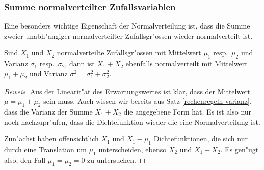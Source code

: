 \subsubsection{Summe normalverteilter Zufallsvariablen}

Eine besonders wichtige Eigenschaft der Normalverteilung ist, dass die
Summe zweier unabh"angiger normalverteilter Zufallsgr"ossen wieder normalverteilt
ist.
\begin{satz}
Sind $X_1$ und $X_2$ normalverteilte Zufallsgr"ossen mit Mittelwert $\mu_1$
resp.~$\mu_2$ und Varianz $\sigma_1$ resp.~$\sigma_2$, dann ist
$X_1+X_2$ ebenfalls normalverteilt mit Mittelwert $\mu_1+\mu_2$ und
Varianz $\sigma^2=\sigma_1^2+\sigma_2^2$.
\end{satz}
\begin{proof}[Beweis]
Aus der Linearit"at des Erwartungswertes ist klar, dass der Mittelwert
$\mu=\mu_1+\mu_2$ sein muss.
Auch wissen wir bereits aus Satz \ref{rechenregeln-varianz}, dass
die Varianz der Summe $X_1+X_2$ die angegebene Form hat.
Es ist also nur
noch nachzupr"ufen, dass die Dichtefunktion wieder die eine Normalverteilung
ist.

Zun"achst haben offensichtlich $X_1$ und $X_1-\mu_1$ Dichtefunktionen,
die sich nur durch eine Translation um $\mu_1$  unterscheiden, ebenso
$X_2$ und $X_1+X_2$.
Es gen"ugt also, den Fall $\mu_1=\mu_2=0$ zu untersuchen.


\end{proof}

